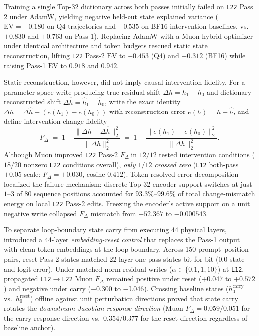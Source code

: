 \documentclass[10pt,letterpaper]{article}
\begin{document}
Training a single Top-32 dictionary across both passes initially failed on \texttt{L22} Pass 2 under AdamW, yielding negative held-out state explained variance ($\mathrm{EV} = -0.180$ on Q4 trajectories and $-0.535$ on BF16 intervention baselines, vs.\ $+0.830$ and $+0.763$ on Pass 1). Replacing AdamW with a Muon-hybrid optimizer \cite{jordan2024muon} under identical architecture and token budgets rescued static state reconstruction, lifting \texttt{L22} Pass-2 $\mathrm{EV}$ to $+0.453$ (Q4) and $+0.312$ (BF16) while raising Pass-1 $\mathrm{EV}$ to $0.918$ and $0.942$.

Static reconstruction, however, did not imply causal intervention fidelity. For a parameter-space write producing true residual shift $\Delta h = h_1 - h_0$ and dictionary-reconstructed shift $\Delta \hat{h} = \hat{h}_1 - \hat{h}_0$, write the exact identity $\Delta h = \Delta \hat{h} + (e(h_1) - e(h_0))$ with reconstruction error $e(h) = h - \hat{h}$, and define intervention-change fidelity
\begin{equation}
  F_\Delta \;=\; 1 - \frac{\|\Delta h - \Delta \hat{h}\|_2^2}{\|\Delta h\|_2^2}
  \;=\; 1 - \frac{\|e(h_1) - e(h_0)\|_2^2}{\|\Delta h\|_2^2}.
  \label{eq:fdelta}
\end{equation}
Although Muon improved \texttt{L22} Pass-2 $F_\Delta$ in $12/12$ tested intervention conditions ($18/20$ nonzero \texttt{L22} conditions overall), \emph{only $1/12$ crossed zero} (\texttt{L12} both-pass $+0.05$ scale: $F_\Delta = +0.030$, cosine $0.412$). Token-resolved error decomposition localized the failure mechanism: discrete Top-32 encoder support switches at just $1$--$3$ of $80$ sequence positions accounted for $93.3\%$--$99.6\%$ of total change-mismatch energy on local \texttt{L22} Pass-2 edits. Freezing the encoder's active support on a unit negative write collapsed $F_\Delta$ mismatch from $-52.367$ to $-0.000543$.

To separate loop-boundary state carry from executing 44 physical layers, \cite{dugan2026vpd} introduced a 44-layer \emph{embedding-reset control} that replaces the Pass-1 output with clean token embeddings at the loop boundary. Across 150 prompt--position pairs, reset Pass-2 states matched 22-layer one-pass states bit-for-bit ($0.0$ state and logit error). Under matched-norm residual writes ($\alpha \in \{0.1, 1, 10\}$) at \texttt{L12}, propagated \texttt{L12}$\to$\texttt{L22} Muon $F_\Delta$ remained positive under reset ($+0.047$ to $+0.572$) and negative under carry ($-0.300$ to $-0.046$). Crossing baseline states ($h_0^{\mathrm{carry}}$ vs.\ $h_0^{\mathrm{reset}}$) offline against unit perturbation directions proved that state carry rotates the \emph{downstream Jacobian response direction} ($\text{Muon } F_\Delta = 0.059/0.051$ for the carry response direction vs.\ $0.354/0.377$ for the reset direction regardless of baseline anchor).
\end{document}
